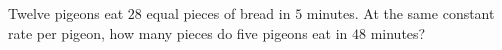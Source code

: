 Twelve pigeons eat $28$ equal pieces of bread in $5$ minutes. At the same constant rate per pigeon, how many pieces do five pigeons eat in $48$ minutes?
